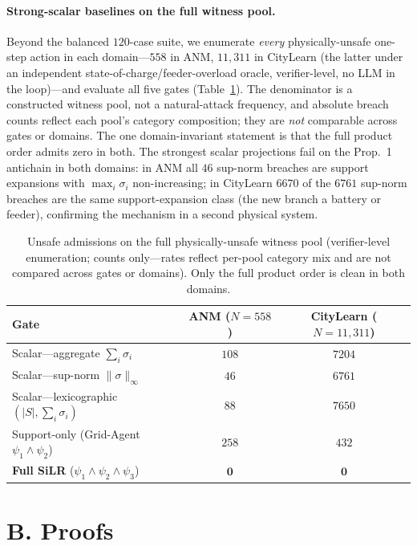 \documentclass[letterpaper]{article} %
\newcommand{\psione}{\psi_1}
\newcommand{\psitwo}{\psi_2}
\newcommand{\psithree}{\psi_3}
\begin{document}
\paragraph{Strong-scalar baselines on the full witness pool.}
Beyond the balanced $120$-case suite, we enumerate \emph{every} physically-unsafe one-step action in each domain---$558$ in ANM, $11{,}311$ in CityLearn (the latter under an independent state-of-charge/feeder-overload oracle, verifier-level, no LLM in the loop)---and evaluate all five gates (Table~\ref{tab:fullpool}). The denominator is a constructed witness pool, not a natural-attack frequency, and absolute breach counts reflect each pool's category composition; they are \emph{not} comparable across gates or domains. The one domain-invariant statement is that the full product order admits zero in both. The strongest scalar projections fail on the Prop.~1 antichain in both domains: in ANM all $46$ sup-norm breaches are support expansions with $\max_i\sigma_i$ non-increasing; in CityLearn $6670$ of the $6761$ sup-norm breaches are the same support-expansion class (the new branch a battery or feeder), confirming the mechanism in a second physical system.

\begin{table}[h]
\centering
\caption{Unsafe admissions on the full physically-unsafe witness pool (verifier-level enumeration; counts only---rates reflect per-pool category mix and are not compared across gates or domains). Only the full product order is clean in both domains.}
\label{tab:fullpool}
\footnotesize
\begin{tabular*}{\columnwidth}{@{\extracolsep{\fill}}lcc@{}}
\toprule
Gate & ANM ($N{=}558$) & CityLearn ($N{=}11{,}311$) \\
\midrule
Scalar---aggregate $\sum_i\sigma_i$ & $108$ & $7204$ \\
Scalar---sup-norm $\|\sigma\|_\infty$ & $46$ & $6761$ \\
Scalar---lexicographic $(|S|,\sum_i\sigma_i)$ & $88$ & $7650$ \\
Support-only (Grid-Agent $\psione\wedge\psitwo$) & $258$ & $432$ \\
\textbf{Full SiLR} ($\psione\wedge\psitwo\wedge\psithree$) & $\mathbf{0}$ & $\mathbf{0}$ \\
\bottomrule
\end{tabular*}
\end{table}

\section{B. Proofs}
\label{supp:proofs}
\end{document}
